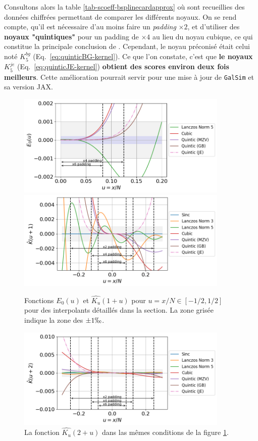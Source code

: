 \documentclass[11pt,twoside]{article}
\begin{document}
Consultons alors la table \ref{tab-scoeff-bsplinecardapprox} où sont recueillies des données chiffrées permettant de comparer les différents noyaux. On se rend compte,  qu'il est nécessaire d'au moins faire un \textit{padding} $\times 2$, et d'utiliser des \textbf{noyaux "quintiques"} pour un padding de $\times 4$ au lieu du noyau cubique, ce qui constitue la principale conclusion de \cite{2014PASP..126..287B}. Cependant, le noyau préconisé était celui noté $K_5^{bg}$ (Eq.~\ref{eq:quinticBG-kernel}). Ce que l'on constate, c'est que \textbf{le noyaux $K_5^{je}$ }(Eq.~\ref{eq:quinticJE-kernel}) \textbf{obtient des scores environ deux fois meilleurs}. Cette amélioration pourrait servir pour une mise à jour de \texttt{GalSim} et sa version JAX.

\begin{figure}
\centering
\includegraphics[width=0.9\textwidth]{fig15a.png}
\includegraphics[width=0.9\textwidth]{fig15b.png}
\caption{Fonctions $E_0(u)$ et $\widehat{K_u}(1+u)$ pour $u=x/N\in[-1/2,1/2]$ pour des interpolants détaillés dans la section. La zone grisée indique la zone des $\pm 1\permil$.}
\label{fig-E0-et-ghostsfactor}
\end{figure}
%
\begin{figure}
\centering
\includegraphics[width=0.9\textwidth]{fig16.png}
\caption{La fonction $\widehat{K_u}(2+u)$ dans las mêmes conditions de la figure \ref{fig-E0-et-ghostsfactor}.}
\label{fig-2nd-ghostsfactor}
\end{figure}
\end{document}
